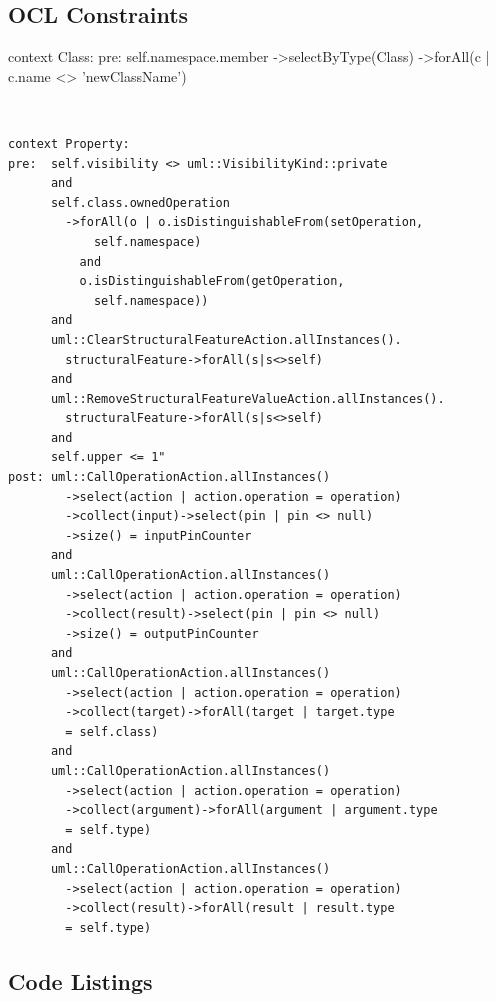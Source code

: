 \documentclass{llncs}
\begin{document}
\subsection{OCL Constraints}
\label{sec:appconstraints}

\begin{lstsingle}[language=OCL,caption=OCL for \textit{rename class} refactoring,label=lst:renameclass]
context Class:
pre:  self.namespace.member
      ->selectByType(Class)
      ->forAll(c | c.name <> 'newClassName')
\end{lstsingle}
\\
\begin{lstlisting}[language=OCL,caption=OCL for \textit{encapsulate property} refactoring,label=lst:encapsulate]
context Property:
pre:  self.visibility <> uml::VisibilityKind::private 
      and 
      self.class.ownedOperation
        ->forAll(o | o.isDistinguishableFrom(setOperation, 
            self.namespace)
          and 
          o.isDistinguishableFrom(getOperation, 
            self.namespace)) 
      and 
      uml::ClearStructuralFeatureAction.allInstances().
        structuralFeature->forAll(s|s<>self)
      and
      uml::RemoveStructuralFeatureValueAction.allInstances().
        structuralFeature->forAll(s|s<>self)
      and
      self.upper <= 1"
post: uml::CallOperationAction.allInstances()
        ->select(action | action.operation = operation)
        ->collect(input)->select(pin | pin <> null)
        ->size() = inputPinCounter
      and
      uml::CallOperationAction.allInstances()
        ->select(action | action.operation = operation)
        ->collect(result)->select(pin | pin <> null)
        ->size() = outputPinCounter
      and
      uml::CallOperationAction.allInstances()
        ->select(action | action.operation = operation)
        ->collect(target)->forAll(target | target.type 
        = self.class)
      and 
      uml::CallOperationAction.allInstances()
        ->select(action | action.operation = operation)
        ->collect(argument)->forAll(argument | argument.type 
        = self.type)
      and
      uml::CallOperationAction.allInstances()
        ->select(action | action.operation = operation)
        ->collect(result)->forAll(result | result.type 
        = self.type)
\end{lstlisting}

\subsection{Code Listings}
\label{sec:applistings}
\end{document}
